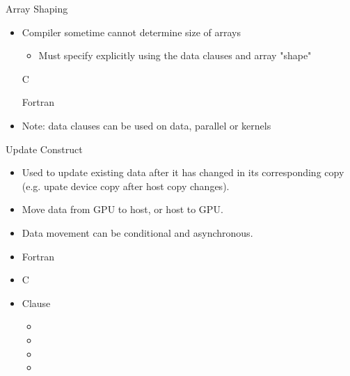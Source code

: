 \documentclass[10pt,t]{beamer}
\begin{document}
\begin{frame}[fragile]{\small Array Shaping}
  \begin{itemize}
    \item Compiler sometime cannot determine size of arrays
    \begin{itemize}
      \item Must specify explicitly using the data clauses and array "shape"
    \end{itemize}
    \item[C] 
    \item[Fortran] 
    \item Note: data clauses can be used on data, parallel or kernels
  \end{itemize}
\end{frame}

\begin{frame}[fragile]{\small Update Construct}
  \begin{itemize}
    \item Used to update existing data after it has changed in its corresponding copy (e.g. upate device copy after host copy changes).
    \item Move data from GPU to host, or host to GPU.
    \item Data movement can be conditional and asynchronous.
    \item Fortran
    \item[] 
    \item C
    \item[] 
    \item Clause
    \begin{itemize}
      \item {}
      \item {}
      \item {}
      \item {}
    \end{itemize}
  \end{itemize}
\end{frame}

\begin{frame}[fragile]
  \begin{columns}[t]
     
     
  \end{columns}
\end{frame}
\end{document}
